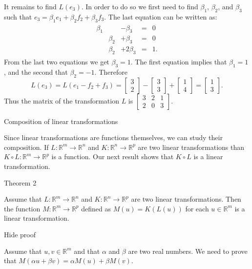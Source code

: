 It remains to find \( L(e_3) \). In order to do so we first need to find \( \beta_1 \), \( \beta_2 \), and \( \beta_3 \) such that \( e_3=\beta_1e_1+\beta_2f_2+\beta_3f_3 \). The last equation can be written as: \begin{eqnarray*} \begin{array}{ccccc} \beta_1&&-\beta_3&=&0\\ &\beta_2&+\beta_3&=&0\\ &\beta_2&+2\beta_3&=&1. \end{array} \end{eqnarray*} From the last two equations we get \( \beta_3=1 \). The first equation implies that \( \beta_1=1 \), and the second that \( \beta_2=-1 \). Therefore \[L(e_3)=L(e_1-f_2+f_3)=\left[\begin{array}{c}3\\2\end{array}\right]-\left[\begin{array}{c}3\\3\end{array}\right]+ \left[\begin{array}{c}1\\4\end{array}\right]=\left[\begin{array}{c}1\\3\end{array}\right].\] Thus the matrix of the transformation \( L \) is \( \left[\begin{array}{ccc}3&2&1\\2&0&3\end{array}\right]\).

Composition of linear transformations

Since linear transformations are functions themselves, we can study their composition. If \( L:\mathbb R^m\to\mathbb R^n \) and \( K:\mathbb R^n\to\mathbb R^p \) are two linear transformations than \( K\circ L:\mathbb R^m\to\mathbb R^p \) is a function. Our next result shows that \( K\circ L \) is a linear transformation.

Theorem 2


Assume that \( L:\mathbb R^m\to\mathbb R^n \) and \( K:\mathbb R^n\to\mathbb R^p \) are two linear transformations. Then the function \( M:\mathbb R^m\to\mathbb R^p \) defined as \( M(u)=K(L(u)) \) for each \( u\in\mathbb R^m \) is a linear transformation.

Hide proof

Assume that \( u,v\in\mathbb R^m \) and that \( \alpha \) and \( \beta \) are two real numbers. We need to prove that \( M(\alpha u+\beta v)=\alpha M(u)+\beta M(v) \).

